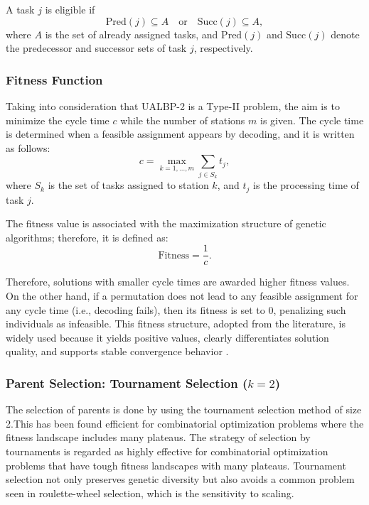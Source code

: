 \documentclass[12pt,a4paper]{article}
\begin{document}
A task $j$ is eligible if
\[
\mathrm{Pred}(j) \subseteq A \quad \text{or} \quad \mathrm{Succ}(j) \subseteq A,
\]
where $A$ is the set of already assigned tasks, and $\mathrm{Pred}(j)$ and $\mathrm{Succ}(j)$ denote the predecessor and successor sets of task $j$, respectively.





\subsubsection{Fitness Function}

Taking into consideration that UALBP-2 is a Type-II problem, the aim is to minimize the cycle time $c$ while the number of stations $m$ is given. The cycle time is determined when a feasible assignment appears by decoding, and it is written as follows:
\begin{equation}
c = \max_{k=1,\dots,m} \sum_{j \in S_k} t_j ,
\label{eq:cycle_time}
\end{equation}
where $S_k$ is the set of tasks assigned to station $k$, and $t_j$ is the processing time of task $j$.

The fitness value is associated with the maximization structure of genetic algorithms; therefore, it is defined as:
\begin{equation}
\mathrm{Fitness} = \frac{1}{c}.
\label{eq:fitness}
\end{equation}

Therefore, solutions with smaller cycle times are awarded higher fitness values. On the other hand, if a permutation does not lead to any feasible assignment for any cycle time (i.e., decoding fails), then its fitness is set to $0$, penalizing such individuals as infeasible. This fitness structure, adopted from the literature, is widely used because it yields positive values, clearly differentiates solution quality, and supports stable convergence behavior \cite{ErelSarin1998}.



\subsubsection{Parent Selection: Tournament Selection ($k = 2$)}
The selection of parents is done by using the tournament selection method of size 2.This has been found efficient for combinatorial optimization problems where the fitness landscape includes many plateaus. The strategy of selection by tournaments is regarded as highly effective for combinatorial optimization problems that have tough fitness landscapes with many plateaus. Tournament selection not only preserves genetic diversity but also avoids a common problem seen in roulette-wheel selection, which is the sensitivity to scaling.
\cite{BlickleThiele1996}
\end{document}
